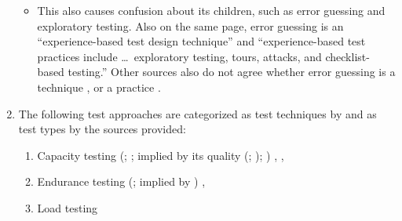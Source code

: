 \begin{enumerate}
\begin{itemize}
                  \item This also causes confusion about its children, such as
                        error guessing and exploratory testing. Also on the
                        same page, \citet[p.~34]{IEEE2022} 
                        error guessing is an ``experience-based test design
                        technique'' and ``experience-based test practices
                        include \dots\ exploratory testing, tours, attacks, and
                        checklist-based testing.'' Other sources also do not
                        agree whether error guessing is a technique
                        \ifnotpaper
                            \citetext{pp.~20,~22,~34; \citeyear[p.~viii]{IEEE2021}}
                        \else
                            \cite[pp.~20,~22,~34]{IEEE2022}, \cite[p.~viii]{IEEE2021}
                        \fi or a practice \citep[p.~5-14]{SWEBOK2024}.
              \end{itemize}
          \fi
    \item %
          The following test approaches are categorized as test
          techniques by \citep[p.~38]{IEEE2021} and as test types by the
          sources provided:
          \begin{enumerate}
              \item Capacity testing
                    \ifnotpaper
                        (\citealp[p.~22]{IEEE2022};
                        \citeyear[p.~2]{IEEE2013}; implied by its quality
                        (\citealp{ISO_IEC2023a}; \citealp[Tab.~A.1]{IEEE2021});
                        \citealp[p.~53]{Firesmith2015})%
                    \else
                        \cite[p.~22]{IEEE2022}, \cite[p.~2]{IEEE2013}%
                    \fi,
              \item Endurance testing
                    \ifnotpaper
                        (\citealp[p.~2]{IEEE2013};
                        implied by \citealp[p.~55]{Firesmith2015})%
                    \else
                        \cite[p.~2]{IEEE2013}%
                    \fi,
              \item Load testing

\end{enumerate}
\end{enumerate}
